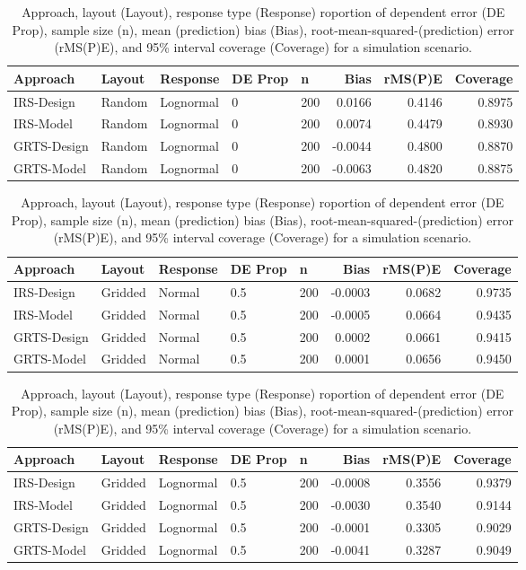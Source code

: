 \documentclass[]{elsarticle} %
\begin{document}
\begin{table}[ht]
\centering
\begin{tabular}{lllllrrr}
  \hline
Approach & Layout & Response & DE Prop & n & Bias & rMS(P)E & Coverage \\ 
  \hline
IRS-Design & Random & Lognormal & 0 & 200 & 0.0166 & 0.4146 & 0.8975 \\ 
  IRS-Model & Random & Lognormal & 0 & 200 & 0.0074 & 0.4479 & 0.8930 \\ 
  GRTS-Design & Random & Lognormal & 0 & 200 & -0.0044 & 0.4800 & 0.8870 \\ 
  GRTS-Model & Random & Lognormal & 0 & 200 & -0.0063 & 0.4820 & 0.8875 \\ 
   \hline
\end{tabular}
\caption{Approach, layout (Layout), response type (Response) roportion of dependent error (DE Prop), sample size (n), mean (prediction) bias (Bias), root-mean-squared-(prediction) error (rMS(P)E), and 95\% interval coverage (Coverage) for a simulation scenario.} 
\end{table}
\begin{table}[ht]
\centering
\begin{tabular}{lllllrrr}
  \hline
Approach & Layout & Response & DE Prop & n & Bias & rMS(P)E & Coverage \\ 
  \hline
IRS-Design & Gridded & Normal & 0.5 & 200 & -0.0003 & 0.0682 & 0.9735 \\ 
  IRS-Model & Gridded & Normal & 0.5 & 200 & -0.0005 & 0.0664 & 0.9435 \\ 
  GRTS-Design & Gridded & Normal & 0.5 & 200 & 0.0002 & 0.0661 & 0.9415 \\ 
  GRTS-Model & Gridded & Normal & 0.5 & 200 & 0.0001 & 0.0656 & 0.9450 \\ 
   \hline
\end{tabular}
\caption{Approach, layout (Layout), response type (Response) roportion of dependent error (DE Prop), sample size (n), mean (prediction) bias (Bias), root-mean-squared-(prediction) error (rMS(P)E), and 95\% interval coverage (Coverage) for a simulation scenario.} 
\end{table}
\begin{table}[ht]
\centering
\begin{tabular}{lllllrrr}
  \hline
Approach & Layout & Response & DE Prop & n & Bias & rMS(P)E & Coverage \\ 
  \hline
IRS-Design & Gridded & Lognormal & 0.5 & 200 & -0.0008 & 0.3556 & 0.9379 \\ 
  IRS-Model & Gridded & Lognormal & 0.5 & 200 & -0.0030 & 0.3540 & 0.9144 \\ 
  GRTS-Design & Gridded & Lognormal & 0.5 & 200 & -0.0001 & 0.3305 & 0.9029 \\ 
  GRTS-Model & Gridded & Lognormal & 0.5 & 200 & -0.0041 & 0.3287 & 0.9049 \\ 
   \hline
\end{tabular}
\caption{Approach, layout (Layout), response type (Response) roportion of dependent error (DE Prop), sample size (n), mean (prediction) bias (Bias), root-mean-squared-(prediction) error (rMS(P)E), and 95\% interval coverage (Coverage) for a simulation scenario.} 
\end{table}
\end{document}
